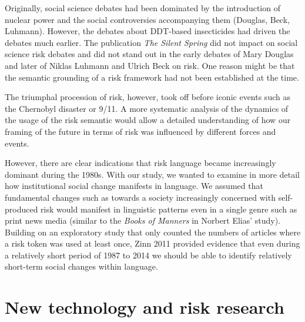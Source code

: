 Originally, social science debates had been dominated by the introduction of nuclear power and the social controversies accompanying them (Douglas, Beck, Luhmann). However, the debates about DDT-based insecticides had driven the debates much earlier. The publication \emph{The Silent Spring} did not impact on social science risk debates and did not stand out in the early debates of Mary Douglas and later of Niklas Luhmann and Ulrich Beck on risk. One reason might be that the semantic grounding of a risk framework had not been established at the time. 

The triumphal procession of risk, however, took off before iconic events such as the Chernobyl disaster or 9\slash 11. A more systematic analysis of the dynamics of the usage of the risk semantic would allow a detailed understanding of how our framing of the future in terms of risk was influenced by different forces and events. 

However, there are clear indications that risk language became increasingly dominant during the 1980s. With our study, we wanted to examine in more detail how institutional social change manifests in language. We assumed that fundamental changes such as towards a society increasingly concerned with self-produced risk would manifest in linguistic patterns even in a single genre such as print news media (similar to the \emph{Books of Manners} in Norbert Elias' study). Building on an exploratory study that only counted the numbers of articles where a risk token was used at least once, Zinn 2011 provided evidence that even during a relatively short period of 1987 to 2014 we should be able to identify relatively short-term social changes within language. 




\section{New technology and risk research}


